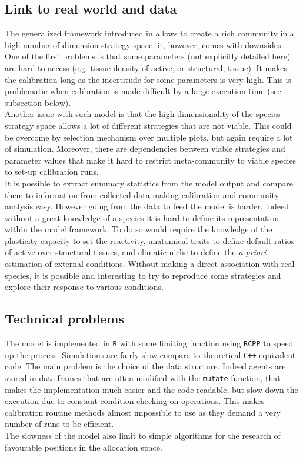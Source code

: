 \subsection{Link to real world and data}
The generalized framework introduced in \model allows to create a rich community in a high number of dimension strategy space, it, however, comes with downsides.\\
\indent One of the first problems is that some parameters (not explicitly detailed here) are hard to access (e.g. tissue density of active, or structural, tissue). It makes the calibration long as the incertitude for some parameters is very high. This is problematic when calibration is made difficult by a large execution time (see subsection below).\\
\indent Another issue with such model is that the high dimensionality of the species strategy space allows a lot of different strategies that are not viable. This could be overcome by selection mechanism over multiple plots, but again require a lot of simulation. Moreover, there are dependencies between viable strategies and parameter values that make it hard to restrict meta-community to viable species to set-up calibration runs.\\
\indent It is possible to extract summary statistics from the model output and compare them to information from collected data making calibration and community analysis easy. However going from the data to feed the model is harder, indeed without a great knowledge of a species it is hard to define its representation within the model framework. To do so would require the knowledge of the plasticity capacity to set the reactivity, anatomical traits to define default ratios of active over structural tissues, and climatic niche to define the \textit{a priori} estimation of external conditions. Without making a direct association with real species, it is possible and interesting to try to reproduce some strategies and explore their response to various conditions.

\subsection{Technical problems}

The model is implemented in \texttt{R} with some limiting function using \texttt{RCPP} to speed up the process. Simulations are fairly slow compare to theoretical \texttt{C++} equivalent code. The main problem is the choice of the data structure. Indeed agents are stored in data.frames that are often modified with the \verb|mutate| function, that makes the implementation much easier and the code readable, but slow down the execution due to constant condition checking on operations. This makes calibration routine methods almost impossible to use as they demand a very number of runs to be efficient.\\
\indent The slowness of the model also limit to simple algorithms for the research of favourable positions in the allocation space.